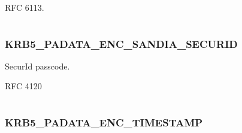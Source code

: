 \documentclass[letterpaper,10pt,english]{sphinxmanual}
\begin{document}
RFC 6113.

\begin{tabulary}{\linewidth}{|L|L|}
\hline

 & 
\\
\hline\end{tabulary}



\subsubsection{KRB5\_PADATA\_ENC\_SANDIA\_SECURID}
\label{appdev/refs/macros/KRB5_PADATA_ENC_SANDIA_SECURID:krb5-padata-enc-sandia-securid-data}\label{appdev/refs/macros/KRB5_PADATA_ENC_SANDIA_SECURID:krb5-padata-enc-sandia-securid}\label{appdev/refs/macros/KRB5_PADATA_ENC_SANDIA_SECURID::doc}

\begin{fulllineitems}
\label{appdev/refs/macros/KRB5_PADATA_ENC_SANDIA_SECURID:KRB5_PADATA_ENC_SANDIA_SECURID}
\end{fulllineitems}


SecurId passcode.

RFC 4120

\begin{tabulary}{\linewidth}{|L|L|}
\hline

 & 
\\
\hline\end{tabulary}



\subsubsection{KRB5\_PADATA\_ENC\_TIMESTAMP}
\label{appdev/refs/macros/KRB5_PADATA_ENC_TIMESTAMP::doc}\label{appdev/refs/macros/KRB5_PADATA_ENC_TIMESTAMP:krb5-padata-enc-timestamp}\label{appdev/refs/macros/KRB5_PADATA_ENC_TIMESTAMP:krb5-padata-enc-timestamp-data}

\begin{fulllineitems}
\label{appdev/refs/macros/KRB5_PADATA_ENC_TIMESTAMP:KRB5_PADATA_ENC_TIMESTAMP}
\end{fulllineitems}
\end{document}
